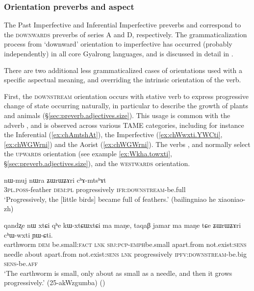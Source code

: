 \subsubsection{Orientation preverbs and aspect} \label{sec:orientation.preverb.aspect}
The Past Imperfective and Inferential Imperfective preverbs  and  correspond to the \textsc{downwards} preverbs of series A and D, respectively. The grammaticalization process from `downward' orientation to imperfective has occurred (probably independently) in all core Gyalrong languages, and is discussed in detail in \citet{lin11direction}.

There are two additional less grammaticalized cases of orientations used with a specific aspectual meaning, and overriding the intrinsic orientation of the verb.

First, the \textsc{downstream} orientation occurs with stative verb to express progressive change of state occurring naturally, in particular to describe the growth of plants and animals (§\ref{sec:preverb.adjectives.size}). This usage is common with the adverb , and is observed across various TAME categories, including for instance the Inferential (\ref{ex:chAmtshAt}), the Imperfective (\ref{ex:chWwxti.YWCti}, \ref{ex:chWGWrni}) and the Aorist (\ref{ex:chWGWrni}). The verbs , and  normally select the \textsc{upwards} orientation (see example \ref{ex:Wkha.towxti}, §\ref{sec:preverb.adjectives.size}), and  the \textsc{westwards} orientation.

\begin{exe}
\ex \label{ex:chAmtshAt}
\gll nɯ-muj nɯra ʑɯrɯʑɤri cʰɤ-mtsʰɤt   \\
 \textsc{3pl}.\textsc{poss}-feather \textsc{dem}:\textsc{pl} progressively \textsc{ifr}:\textsc{downstream}-be.full \\
\glt `Progressively, the [little birds] became full of feathers.' (bailingniao he xiaoniao-zh)
\end{exe}

\begin{exe}
\ex \label{ex:chWwxti.YWCti}
\gll qandʐe nɯ xtɕi qʰe kɯ-xtɕɯ\redp{}xtɕi ma maŋe, taqaβ jamar ma maŋe tɕe ʑɯrɯʑɤri cʰɯ-wxti ɲɯ-ɕti. \\
earthworm \textsc{dem} be.small:\textsc{fact} \textsc{lnk} \textsc{sbj}:\textsc{pcp}-\textsc{emph}\redp{}be.small apart.from not.exist:\textsc{sens} needle about apart.from not.exist:\textsc{sens} \textsc{lnk} progressively \textsc{ipfv}:\textsc{downstream}-be.big \textsc{sens}-be.\textsc{aff} \\
\glt `The earthworm is small, only about as small as a needle, and then it grows progressively.' (25-akWzgumba) () 
\end{exe}

